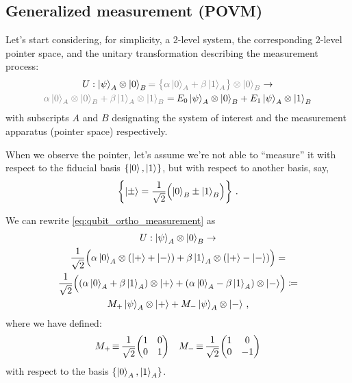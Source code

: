 \subsection{Generalized measurement (POVM)}
\label{subsec:POVM}

Let's start considering, for simplicity, a 2-level system,
the corresponding 2-level pointer space,
and the unitary transformation describing the measurement process:
\begin{multline}\label{eq:qubit_ortho_measurement}
  U:
    \ket{\psi}_A \ox \ket{0}_B
    {\color{gray}= \qty\big{\alpha\ket{0}_A + \beta\ket{1}_A} \ox \ket{0}_B}
  \rightarrow \\
    {\color{gray}\alpha\ket{0}_A \ox \ket{0}_B + \beta\ket{1}_A  \ox \ket{1}_B =}
    \:
    E_0\ket{\psi}_A \ox \ket{0}_B + E_1\ket{\psi}_A \ox \ket{1}_B
\end{multline}
with subscripts $A$ and $B$ designating the system of interest and
the measurement apparatus (pointer space) respectively.

When we observe the pointer, let's assume we're not
able to ``measure'' it with respect to the fiducial basis
$\left\{\ket{0}, \ket{1}\right\}$,
but with respect to another basis, say,
\begin{equation}\label{eq:pmbasis}
\left\{\ket{\pm} = \frac{1}{\sqrt{2}} \qty\Big(\ket{0}_B \pm \ket{1}_B)\right\} \,\text{.}
\end{equation}

We can rewrite \eqref{eq:qubit_ortho_measurement} as
\begin{multline}\label{eq:qubit_gen_measurement}
  U: \ket{\psi}_A \otimes \ket{0}_B                   \rightarrow \\
  \frac{1}{\sqrt{2}} \qty\Big(
    \alpha\ket{0}_A \otimes \qty(\ket{+}+\ket{-}) +
    \beta \ket{1}_A \otimes \qty(\ket{+}-\ket{-})
  )                                               =           \\
  \frac{1}{\sqrt{2}} \qty\Big(
    \qty(\alpha\ket{0}_A + \beta\ket{1}_A) \otimes \ket{+} +
    \qty(\alpha\ket{0}_A - \beta\ket{1}_A) \otimes \ket{-}
  )                                               \coloneqq      \\
  M_+\ket{\psi}_A \otimes \ket{+} + M_-\ket{\psi}_A \otimes \ket{-}
  \,\text{,}
\end{multline}
where we have defined:
\begin{align*}
  &
  M_+ \repr \frac{1}{\sqrt{2}}\mqty(\imat{2})
  &
  M_- \repr \frac{1}{\sqrt{2}}\mqty(1& 0\\0& -1)
\end{align*}
with respect to the basis $\left\{\ket{0}_A, \ket{1}_A\right\}$.

